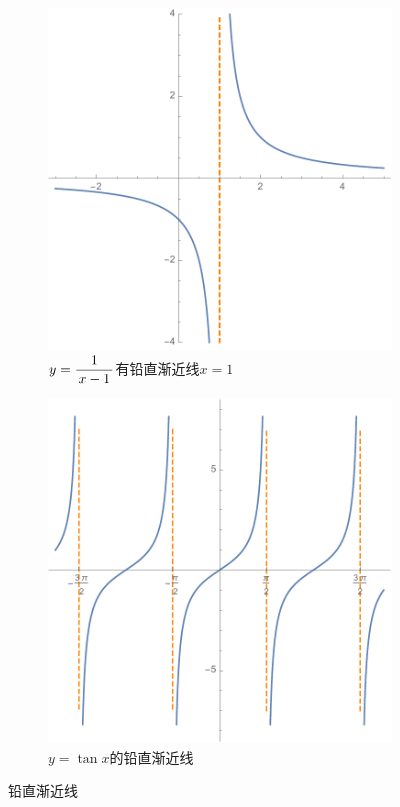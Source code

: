 \begin{figure}[h]
	\centering
	\begin{subfigure}[t]{.45\textwidth}
		\centering
		\includegraphics[width=\textwidth]{./Images/Ch01/1x-1Asy.pdf}
		\caption{$y=\displaystyle\frac{\,{1}\,}{\,{x-1}\,}$有铅直渐近线$x=1$}
	\end{subfigure}
	\begin{subfigure}[t]{.45\textwidth}
		\centering
		\includegraphics[width=\textwidth]{./Images/Ch01/TanAsy.pdf}
		\caption{$y=\tan x$的铅直渐近线}
	\end{subfigure}
	\caption{铅直渐近线}
	\label{fig:verAsy}
\end{figure}

